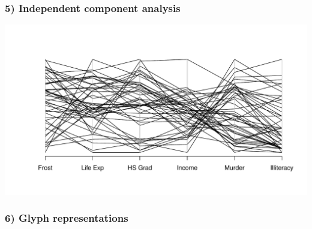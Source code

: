 \documentclass[
]{article}
\newenvironment{Shaded}{\begin{snugshade}}{\end{snugshade}}
\newcommand{\AttributeTok}[1]{\textcolor[rgb]{0.77,0.63,0.00}{#1}}
\newcommand{\CommentTok}[1]{\textcolor[rgb]{0.56,0.35,0.01}{\textit{#1}}}
\newcommand{\ControlFlowTok}[1]{\textcolor[rgb]{0.13,0.29,0.53}{\textbf{#1}}}
\newcommand{\DecValTok}[1]{\textcolor[rgb]{0.00,0.00,0.81}{#1}}
\newcommand{\FunctionTok}[1]{\textcolor[rgb]{0.00,0.00,0.00}{#1}}
\newcommand{\NormalTok}[1]{#1}
\newcommand{\OtherTok}[1]{\textcolor[rgb]{0.56,0.35,0.01}{#1}}
\newcommand{\SpecialCharTok}[1]{\textcolor[rgb]{0.00,0.00,0.00}{#1}}
\begin{document}
\newpage

\hypertarget{independent-component-analysis}{%
\subsubsection{5) Independent component
analysis}\label{independent-component-analysis}}

\begin{Shaded}
\end{Shaded}

\includegraphics{modern_applied_statistics_CH11_files/figure-latex/unnamed-chunk-14-1.pdf}

\newpage

\hypertarget{glyph-representations}{%
\subsubsection{6) Glyph representations}\label{glyph-representations}}
\end{document}
